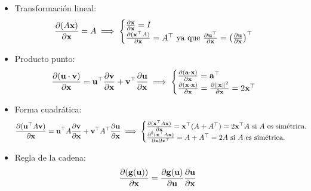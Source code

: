 \begin{itemize}

	\item Transformación lineal:
	\begin{equation}
		\frac{\partial (A\mathbf{x})}{\partial \mathbf{x}}=A \implies \begin{cases}
		\frac{\partial \mathbf{x}}{\partial \mathbf{x}} = I\\
			\frac{\partial (\mathbf{x}^\top A)}{\partial \mathbf{x}} = A^\top  \text{ ya que } \frac{\partial \bf{u}^\top }{\partial \mathbf{x}} = \left( \frac{\partial \bf{u}}{\partial \mathbf{x}}\right)^\top
		\end{cases}
	\end{equation}
	
	\item Producto punto:
	\begin{equation}
		\frac{\partial (\bf{u}\cdot \bf{v})}{\partial \mathbf{x}} = \bf{u}^\top \frac{\partial \bf{v}}{\partial \mathbf{x}} + \bf{v}^\top  \frac{\partial \bf{u}}{\partial \mathbf{x}} \implies \begin{cases}
 	\frac{\partial (\bf{a}\cdot \mathbf{x})}{\partial \mathbf{x}} = \bf{a}^\top\\
 	\frac{\partial (\mathbf{x}\cdot \mathbf{x})}{\partial \mathbf{x}} = \frac{\partial \left\lVert\mathbf{x}\right\rVert^2}{\partial \mathbf{x}} = 2\mathbf{x}^\top 
 \end{cases}
	\end{equation}
	
	\item Forma cuadrática:
	\begin{equation}
		\frac{\partial (\textbf{u}^\top A \textbf{v})}{\partial \mathbf{x}} = \textbf{u}^\top A \frac{\partial \bf{v}}{\partial \mathbf{x}} + \textbf{v}^\top A^\top  \frac{\partial \bf{u}}{\partial \mathbf{x}} \implies \begin{cases}
 	\frac{\partial (\mathbf{x}^\top A\mathbf{x})}{\partial \mathbf{x}} = \mathbf{x}^\top(A+A^\top)=2\mathbf{x}^\top A\text{ si $A$ es simétrica}.\\
 	\frac{\partial^2 (\mathbf{x}^\top A\mathbf{x})}{\partial \mathbf{x} \partial \mathbf{x}^\top} = A + A^\top =2A\text{ si $A$ es simétrica}.
 \end{cases}
	\end{equation}
	
	\item Regla de la cadena:
	\begin{equation}
		\frac{\partial (\bf{g}(\bf{u}))}{\partial \mathbf{x}} = \frac{\partial \bf{g}(\bf{u})}{\partial \bf{u}} \frac{\partial \bf{u}}{\partial \mathbf{x}}
	\end{equation}

\end{itemize}

